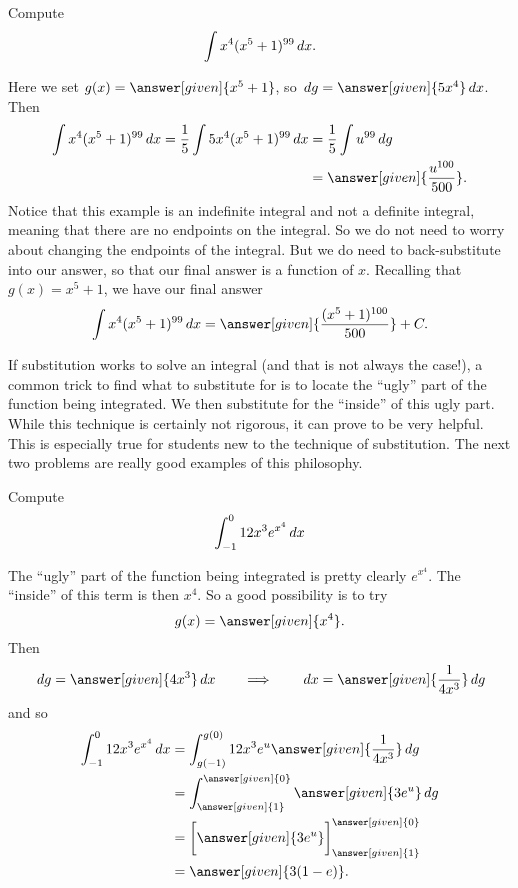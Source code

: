 \documentclass{ximera}
\begin{document}
\begin{example}
Compute
\[
\int x^4(x^5+1)^{99} \,d x.
\]
\begin{explanation}
Here we set $g(x) =  \answer[given]{x^5+1}$, so $\d g =  \answer[given]{5x^4} \d x$.  Then
\begin{align*}
\int x^4(x^5+1)^{99} \d x = \frac{1}{5} \int 5x^4 (x^5+1)^{99} \d x &= \frac{1}{5} \int u^{99} \d g\\
&= \answer[given]{\frac{u^{100}}{500}}.
\end{align*}
Notice that this example is an indefinite integral and not a definite integral, meaning that there are no endpoints on the integral.  
So we do not need to worry about changing the endpoints of the integral.  
But we do need to back-substitute into our answer, so that our final answer is a function of $x$.  
Recalling that $g(x) =  x^5+1$, we have our final answer
\[
\int x^4(x^5+1)^{99} \d x= \answer[given]{\frac{(x^5+1)^{100}}{500}}+C.
\]
\end{explanation}
\end{example}


If substitution works to solve an integral (and that is not always the case!), a common trick to find what to substitute for is to locate the ``ugly'' part of the function being integrated.
We then substitute for the ``inside'' of this ugly part.  
While this technique is certainly not rigorous, it can prove to be very helpful.  
This is especially true for students new to the technique of substitution.  
The next two problems are really good examples of this philosophy.

\begin{example}
Compute
\[
\int_{-1}^0 12x^3 e^{x^4} \,d x
\]
\begin{explanation}
The ``ugly'' part of the function being integrated is pretty clearly $e^{x^4}$.  
The ``inside'' of this term is then $x^4$.  
So a good possibility is to try 
\[
g(x) =  \answer[given]{x^4}.
\]
Then
\[
\d g =  \answer[given]{4x^3} \d x 	\qquad	\Longrightarrow	\qquad	\d x = \answer[given]{\frac{1}{4x^3}} \d g
\]
and so
\begin{align*}
\int_{-1}^0 12x^3 e^{x^4} \d x &= \int_{g(-1)}^{g(0)} 12 x^3 e^u \answer[given]{\frac{1}{4x^3}} \d g  \\
&= \int_{\answer[given]{1}}^{\answer[given]{0}} \answer[given]{3 e^u} \d g  \\
&= \eval{\answer[given]{3e^u}}_{\answer[given]{1}}^{\answer[given]{0}}  \\
&= \answer[given]{3(1-e)}.
\end{align*}
\end{explanation}
\end{example}
\end{document}
